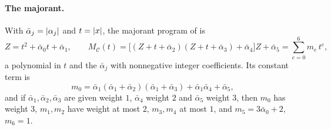\paragraph{The majorant.}
With $\bar\alpha_j=\left\lvert \alpha_j\right\rvert$ and $t=\left\lvert x\right\rvert$, the majorant program of
 is
\begin{equation}
\label{eq:pan-majorant}
  Z=t^2+\bar\alpha_0t+\bar\alpha_1,\qquad
  M_{\mathcal C}(t)=\bigl[(Z+t+\bar\alpha_2)(Z+t+\bar\alpha_3)+\bar\alpha_4\bigr]Z+\bar\alpha_5
  =\sum_{e=0}^{6}m_e\,t^e ,
\end{equation}
a polynomial in $t$ and the $\bar\alpha_j$ with nonnegative integer
coefficients.  Its constant term is
\[
  m_0=\bar\alpha_1(\bar\alpha_1+\bar\alpha_2)(\bar\alpha_1+\bar\alpha_3)+\bar\alpha_1\bar\alpha_4+\bar\alpha_5 ,
\]
and if $\bar\alpha_1,\bar\alpha_2,\bar\alpha_3$ are given weight $1$,
$\bar\alpha_4$ weight $2$ and $\bar\alpha_5$ weight $3$, then $m_0$ has weight
$3$, $m_1,m_2$ have weight at most $2$, $m_3,m_4$ at most $1$, and
$m_5=3\bar\alpha_0+2$, $m_6=1$.

